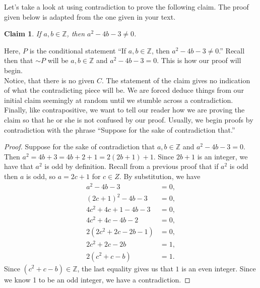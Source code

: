 \documentclass[12 pt]{article}
\newcommand{\Z}{\mathbb{Z}}
\theoremstyle{definition}
\theoremstyle{plain}
\theoremstyle{mytheorem}
\newtheorem{claim}{Claim}
\theoremstyle{myexample}
\theoremstyle{mydefinition}
\begin{document}
\vspace{.5in}

\noindent  Let's take a look at using contradiction to prove the following claim.  The proof given below is adapted from the one given in your text.

\begin{claim} If $a,b \in \Z$, then $a^2-4b-3 \neq 0$.
\end{claim}

Here, $P$ is the conditional statement ``If $a,b \in \Z$, then $a^2-4b-3 \neq 0$.''  Recall then that $\sim P$ will be $a, b \in \Z$ and $a^2-4b-3=0$.  This is how our proof will begin.\\

Notice, that there is no given $C$.  The statement of the claim gives no indication of what the contradicting piece will be.  We are forced deduce things from our initial claim seemingly at random until we stumble across a contradiction.\\

Finally, like contrapositive, we want to tell our reader how we are proving the claim so that he or she is not confused by our proof.  Usually, we begin proofs by contradiction with the phrase ``Suppose for the sake of contradiction that.''\\

\begin{proof}  Suppose for the sake of contradiction that $a,b \in \Z$ and $a^2-4b-3 = 0$.  Then $a^2=4b+3=4b+2+1=2(2b+1)+1.$  Since $2b+1$ is an integer, we have that $a^2$ is odd by definition.  Recall from a previous proof that if $a^2$ is odd then $a$ is odd, so $a=2c+1$ for $c \in Z$.  By substitution, we have
	\begin{align*}
	a^2-4b-3 &= 0,\\
	(2c+1)^2-4b-3 &= 0, \\
	4c^2+4c+1 -4b-3 &= 0,\\
	4c^2+4c-4b-2 &= 0,\\
	2(2c^2+2c-2b-1) &=0, \\
	2c^2 +2c -2b &= 1, \\
	2(c^2+c-b) &= 1.
	\end{align*}
Since $(c^2+c-b) \in \Z$, the last equality gives us that $1$ is an even integer.  Since we know 1 to be an odd integer, we have a contradiction.
\end{proof}
\end{document}
